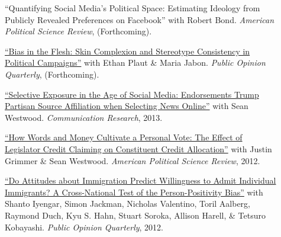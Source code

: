 \documentclass[letterpaper,11pt]{article}
\newcommand{\resheading}[1]{\vspace{4pt}{\large
\colorbox{mygrey}{\begin{minipage}{\textwidth}{\textbf{#1
\vphantom{p\^{E}}}}\end{minipage}}}\vspace{4pt}}
\begin{document}
\resheading{Publications}
\begin{description}


\item[] ``Quantifying Social Media's Political Space: Estimating Ideology from Publicly Revealed Preferences on Facebook'' with Robert Bond.  \emph{American Political Science Review}, (Forthcoming).

\item[] \href{https://www.dropbox.com/s/n356r2epbfnnqfu/HSVmetricsCampaignsDarkness.pdf}{``Bias in the Flesh: Skin Complexion and Stereotype Consistency in Political Campaigns''} with Ethan Plaut \& Maria Jabon. \emph{Public Opinion Quarterly}, (Forthcoming).


\item[] \href{https://www.dropbox.com/s/sl847m7z7uzonro/CH3.pdf}{``Selective Exposure in the Age of Social Media: Endorsements Trump Partisan Source Affiliation when Selecting News Online''} with Sean Westwood. \emph{Communication Research}, 2013.

\item[] \href{http://stanford.edu/~jgrimmer/cc.pdf}{``How Words and Money Cultivate a Personal Vote: The Effect of Legislator Credit Claiming on Constituent Credit Allocation''} with Justin Grimmer \& Sean Westwood. \emph{American Political Science Review}, 2012.

\item[] \href{http://poq.oxfordjournals.org/content/early/2013/09/14/poq.nft024.full.pdf?keytype=ref&ijkey=ynq4b9uNIrXJy3I}{``Do Attitudes about Immigration Predict Willingness to Admit Individual Immigrants? A Cross-National Test of the Person-Positivity Bias''} with Shanto Iyengar, Simon Jackman, Nicholas Valentino, Toril Aalberg, Raymond Duch, Kyu S. Hahn, Stuart Soroka, Allison Harell, \& Tetsuro Kobayashi.  \emph{Public Opinion Quarterly}, 2012.


\end{description}
\end{document}
